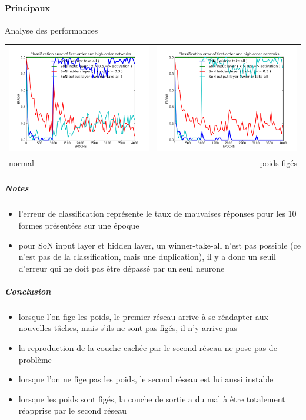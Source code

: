     \paragraph{Principaux}
      Analyse des performances
      \begin{center}
	\begin{tabular}{lr}
	  \hspace*{-1cm}
	  \includegraphics[width=250px]{data/expB2/err.png}
	  &
	  \includegraphics[width=250px]{data/expB2/err_block.png} \\
	  normal
	  &
	  poids figés
	\end{tabular}
      \end{center}
      \subparagraph{Notes}
	\begin{itemize}
	  \item l'erreur de classification représente le taux de mauvaises réponses pour les 10 formes présentées sur une époque
	  \item pour SoN input layer et hidden layer, un winner-take-all n'est pas possible (ce n'est pas de la classification, 
	  mais une duplication), il y a donc un seuil d'erreur qui ne doit pas être dépassé par un seul neurone
	\end{itemize}
      \subparagraph{Conclusion}
	\begin{itemize}
	  \item lorsque l'on fige les poids, le premier réseau arrive à se réadapter aux nouvelles tâches, mais s'ils ne sont
	  pas figés, il n'y arrive pas
	  \item la reproduction de la couche cachée par le second réseau ne pose pas de problème
	  \item lorsque l'on ne fige pas les poids, le second réseau est lui aussi instable
	  \item lorsque les poids sont figés, la couche de sortie a du mal à être totalement réapprise par le second réseau
	  
	\end{itemize}
